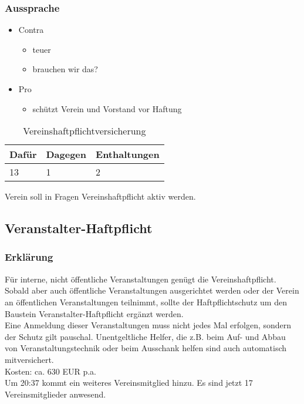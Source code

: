\documentclass[a4paper]{scrartcl}
\begin{document}
\subsubsection{Aussprache}
\begin{itemize}
\item Contra
\begin{itemize}
\item teuer
\item brauchen wir das?
\end{itemize}
\item Pro
\begin{itemize}
\item schützt Verein und Vorstand vor Haftung
\end{itemize}
\end{itemize}
\begin{table}[h]
	\begin{tabularx}{\textwidth}{XXX}
		Dafür & Dagegen & Enthaltungen\\
		\toprule
		13 & 1 & 2\\
	\end{tabularx}
	\caption{Vereinshaftpflichtversicherung}
\end{table}
Verein soll in Fragen Vereinshaftpflicht aktiv werden.
\subsection{Veranstalter-Haftpflicht}
\subsubsection{Erklärung}
Für interne, nicht öffentliche Veranstaltungen genügt die Vereinshaftpflicht. Sobald aber auch öffentliche Veranstaltungen ausgerichtet werden oder der Verein an öffentlichen Veranstaltungen teilnimmt, sollte der Haftpflichtschutz um den Baustein Veranstalter-Haftpflicht ergänzt werden.\\
Eine Anmeldung dieser Veranstaltungen muss nicht jedes Mal erfolgen, sondern der Schutz gilt pauschal. Unentgeltliche Helfer, die z.B. beim Auf- und Abbau von Veranstaltungstechnik oder beim Ausschank helfen sind auch automatisch mitversichert.\\
Kosten: ca. 630 EUR p.a.\\
Um 20:37 kommt ein weiteres Vereinsmitglied hinzu. Es sind jetzt 17 Vereinsmitglieder anwesend.\\
\end{document}
